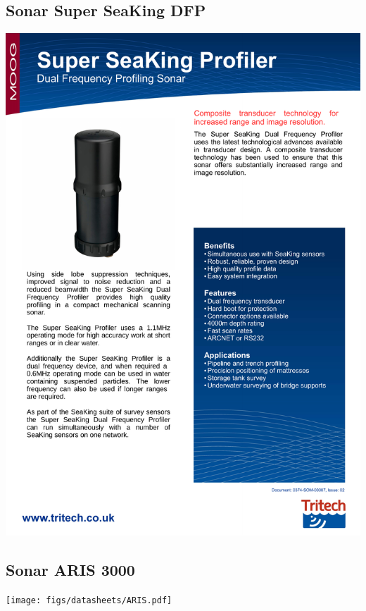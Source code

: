 \subsection{Sonar Super SeaKing DFP}
\includegraphics[width=1\columnwidth, page=2]{figs/datasheets/sonar.pdf}
\subsection{Sonar ARIS 3000}
\texttt{[image: figs/datasheets/ARIS.pdf]}
